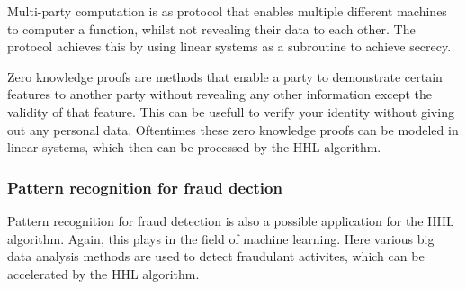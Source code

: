     Multi-party computation is as protocol that enables multiple different machines to computer a function, whilst not revealing their data to each other. 
    The protocol achieves this by using linear systems as a subroutine to achieve secrecy.

    Zero knowledge proofs are methods that enable a party to demonstrate certain features to another party without revealing any other information except the validity of that feature.
    This can be usefull to verify your identity without giving out any personal data.
    Oftentimes these zero knowledge proofs can be modeled in linear systems, which then can be processed by the HHL algorithm.

    \subsubsection{Pattern recognition for fraud dection}
    Pattern recognition for fraud detection is also a possible application for the HHL algorithm.
    Again, this plays in the field of machine learning. 
    Here various big data analysis methods are used to detect fraudulant activites, which can be accelerated by the HHL algorithm.







